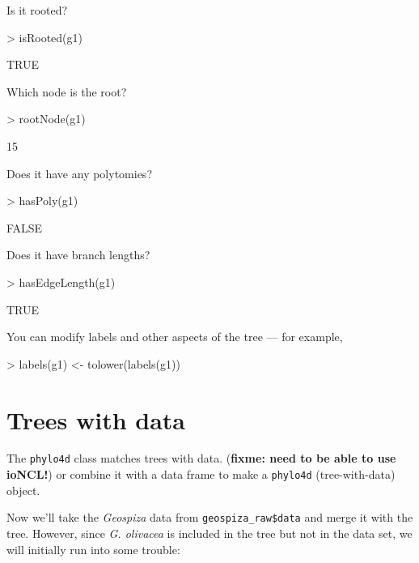 \documentclass{article}
\newcommand{\code}[1]{{{\tt #1}}}
\begin{document}
Is it rooted?
\begin{Schunk}
\begin{Sinput}
> isRooted(g1)
\end{Sinput}
\begin{Soutput}
[1] TRUE
\end{Soutput}
\end{Schunk}

Which node is the root?
\begin{Schunk}
\begin{Sinput}
> rootNode(g1)
\end{Sinput}
\begin{Soutput}
[1] 15
\end{Soutput}
\end{Schunk}

Does it have any polytomies?
\begin{Schunk}
\begin{Sinput}
> hasPoly(g1)
\end{Sinput}
\begin{Soutput}
[1] FALSE
\end{Soutput}
\end{Schunk}

Does it have branch lengths?
\begin{Schunk}
\begin{Sinput}
> hasEdgeLength(g1)
\end{Sinput}
\begin{Soutput}
[1] TRUE
\end{Soutput}
\end{Schunk}

You can modify labels and other aspects
of the tree --- for example,
\begin{Schunk}
\begin{Sinput}
> labels(g1) <- tolower(labels(g1))
\end{Sinput}
\end{Schunk}

\section{Trees with data}

The \code{phylo4d} class matches trees with data.
(\textbf{fixme: need to be able to use ioNCL!})
or combine it with a data frame to make a \code{phylo4d} (tree-with-data)
object.

Now we'll take the \emph{Geospiza} data from \verb+geospiza_raw$data+
and merge it with the tree.  However, since \emph{G. olivacea} is included
in the tree but not in the data set, we will initially run into some trouble:
\end{document}
